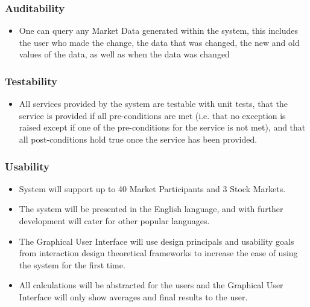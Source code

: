 \documentclass[12pt]{article}
\begin{document}
			    	\subsubsection{Auditability}
			    	\begin{itemize}
				    	\item One can query any Market Data generated within the system, this includes the user who made the change, the data that was changed, the new and old values of the data, as well as when the data was changed
			    	\end{itemize}
			    	
			    	\subsubsection{Testability}
			    	\begin{itemize}
			    		\item All services provided by the system are testable with unit tests, that the service is provided if all pre-conditions are met (i.e. that no exception is raised except if one of the pre-conditions for the service is not met), and that all post-conditions hold true once the service has been provided.
			    	\end{itemize}
			    
			    	\subsubsection{Usability}
			    	\begin{itemize}
			    		\item System will support up to 40 Market Participants and 3 Stock Markets.
                                        \item The system will be presented in the English language, and with further development will cater for other popular languages.
                                        \item The Graphical User Interface will use design principals and usability goals from interaction design theoretical frameworks to increase the ease of using the system for the first time.
                                        \item All calculations will be abstracted for the users and the Graphical User Interface will only show averages and final results to the user.
                                \end{itemize}
			    
\end{document}
